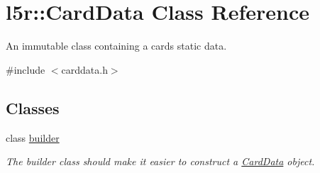 \hypertarget{classl5r_1_1CardData}{}\section{l5r\+:\+:Card\+Data Class Reference}
\label{classl5r_1_1CardData}


An immutable class containing a card\textquotesingle{}s static data.  




{\ttfamily \#include $<$carddata.\+h$>$}

\subsection*{Classes}
\begin{DoxyCompactItemize}
\item 
class \hyperlink{classl5r_1_1CardData_1_1builder}{builder}
\begin{DoxyCompactList}\small\item\em The builder class should make it easier to construct a \hyperlink{classl5r_1_1CardData}{Card\+Data} object. \end{DoxyCompactList}\end{DoxyCompactItemize}
